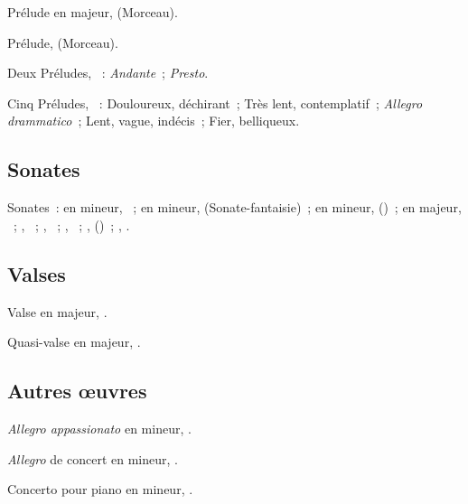 Prélude en \kE \Flat majeur,   (Morceau).

Prélude,   (Morceau).

Deux Préludes, ~:  \emph{Andante}~; 
\emph{Presto}.

Cinq Préludes, ~:  Douloureux, déchirant~; 
Très lent, contemplatif~;  \emph{Allegro drammatico}~; 
Lent, vague, indécis~;  Fier, belliqueux.

\subsection{Sonates}


Sonates~:  en \kF mineur, ~;  en \kG \Sharp
mineur,  (Sonate-fantaisie)~;  en \kF \Sharp mineur,
 ()~;  en \kF \Sharp majeur,
~; , ~; , ~; ,
~; ,  ()~; ,
.

\subsection{Valses}

Valse en \kA \Flat majeur, .

Quasi-valse en \kF majeur, .

\subsection{Autres œuvres}


\emph{Allegro appassionato} en \kE \Flat mineur, .

\emph{Allegro} de concert en \kB \Flat mineur, .

Concerto pour piano en \kF \Sharp mineur, .

